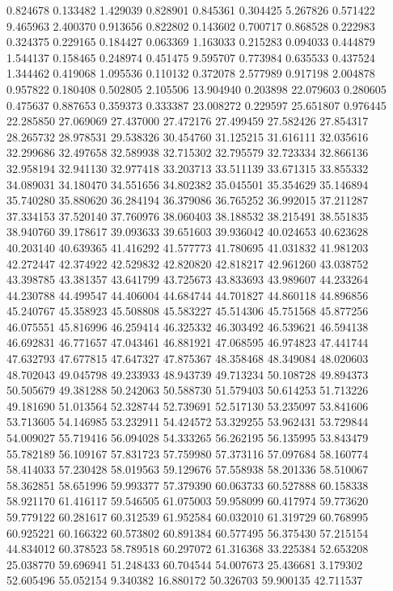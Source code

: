 0.824678
0.133482
1.429039
0.828901
0.845361
0.304425
5.267826
0.571422
9.465963
2.400370
0.913656
0.822802
0.143602
0.700717
0.868528
0.222983
0.324375
0.229165
0.184427
0.063369
1.163033
0.215283
0.094033
0.444879
1.544137
0.158465
0.248974
0.451475
9.595707
0.773984
0.635533
0.437524
1.344462
0.419068
1.095536
0.110132
0.372078
2.577989
0.917198
2.004878
0.957822
0.180408
0.502805
2.105506
13.904940
0.203898
22.079603
0.280605
0.475637
0.887653
0.359373
0.333387
23.008272
0.229597
25.651807
0.976445
22.285850
27.069069
27.437000
27.472176
27.499459
27.582426
27.854317
28.265732
28.978531
29.538326
30.454760
31.125215
31.616111
32.035616
32.299686
32.497658
32.589938
32.715302
32.795579
32.723334
32.866136
32.958194
32.941130
32.977418
33.203713
33.511139
33.671315
33.855332
34.089031
34.180470
34.551656
34.802382
35.045501
35.354629
35.146894
35.740280
35.880620
36.284194
36.379086
36.765252
36.992015
37.211287
37.334153
37.520140
37.760976
38.060403
38.188532
38.215491
38.551835
38.940760
39.178617
39.093633
39.651603
39.936042
40.024653
40.623628
40.203140
40.639365
41.416292
41.577773
41.780695
41.031832
41.981203
42.272447
42.374922
42.529832
42.820820
42.818217
42.961260
43.038752
43.398785
43.381357
43.641799
43.725673
43.833693
43.989607
44.233264
44.230788
44.499547
44.406004
44.684744
44.701827
44.860118
44.896856
45.240767
45.358923
45.508808
45.583227
45.514306
45.751568
45.877256
46.075551
45.816996
46.259414
46.325332
46.303492
46.539621
46.594138
46.692831
46.771657
47.043461
46.881921
47.068595
46.974823
47.441744
47.632793
47.677815
47.647327
47.875367
48.358468
48.349084
48.020603
48.702043
49.045798
49.233933
48.943739
49.713234
50.108728
49.894373
50.505679
49.381288
50.242063
50.588730
51.579403
50.614253
51.713226
49.181690
51.013564
52.328744
52.739691
52.517130
53.235097
53.841606
53.713605
54.146985
53.232911
54.424572
53.329255
53.962431
53.729844
54.009027
55.719416
56.094028
54.333265
56.262195
56.135995
53.843479
55.782189
56.109167
57.831723
57.759980
57.373116
57.097684
58.160774
58.414033
57.230428
58.019563
59.129676
57.558938
58.201336
58.510067
58.362851
58.651996
59.993377
57.379390
60.063733
60.527888
60.158338
58.921170
61.416117
59.546505
61.075003
59.958099
60.417974
59.773620
59.779122
60.281617
60.312539
61.952584
60.032010
61.319729
60.768995
60.925221
60.166322
60.573802
60.891384
60.577495
56.375430
57.215154
44.834012
60.378523
58.789518
60.297072
61.316368
33.225384
52.653208
25.038770
59.696941
51.248433
60.704544
54.007673
25.436681
3.179302
52.605496
55.052154
9.340382
16.880172
50.326703
59.900135
42.711537

